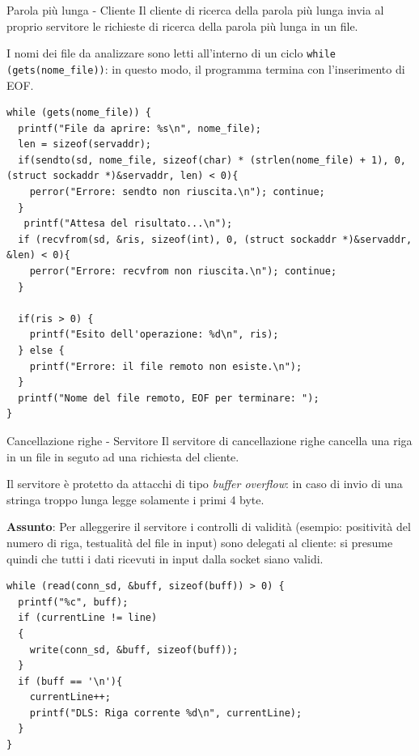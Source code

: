 \documentclass[8pt]{beamer}
\begin{document}
\begin{frame}[fragile]{Parola più lunga - Cliente}
  Il cliente di ricerca della parola più lunga invia al proprio servitore le richieste di ricerca della parola più lunga in un file.
  
  I nomi dei file da analizzare sono letti all'interno di un ciclo \texttt{while (gets(nome\_file))}: 
  in questo modo, il programma termina con l'inserimento di EOF. 
  \small
  \begin{verbatim}
while (gets(nome_file)) {
  printf("File da aprire: %s\n", nome_file);
  len = sizeof(servaddr);
  if(sendto(sd, nome_file, sizeof(char) * (strlen(nome_file) + 1), 0, (struct sockaddr *)&servaddr, len) < 0){
    perror("Errore: sendto non riuscita.\n"); continue;
  }
   printf("Attesa del risultato...\n");
  if (recvfrom(sd, &ris, sizeof(int), 0, (struct sockaddr *)&servaddr, &len) < 0){
    perror("Errore: recvfrom non riuscita.\n"); continue;
  }
  
  if(ris > 0) {
    printf("Esito dell'operazione: %d\n", ris);
  } else {
    printf("Errore: il file remoto non esiste.\n");
  }
  printf("Nome del file remoto, EOF per terminare: ");
}
  \end{verbatim}
\normalsize
\end{frame}
\begin{frame}[fragile]{Cancellazione righe - Servitore}
  Il servitore di cancellazione righe cancella una riga in un file in seguto ad una richiesta del cliente.

  Il servitore è protetto da attacchi di tipo \textit{buffer overflow}: 
  in caso di invio di una stringa troppo lunga legge solamente i primi 4 byte.

  \textbf{Assunto}: Per alleggerire il servitore i controlli di validità (esempio: positività del numero di riga, testualità del file in input) sono delegati al cliente:
  si presume quindi che tutti i dati ricevuti in input dalla socket siano validi. 

  \begin{verbatim}
while (read(conn_sd, &buff, sizeof(buff)) > 0) {
  printf("%c", buff);
  if (currentLine != line)
  {
    write(conn_sd, &buff, sizeof(buff));
  }
  if (buff == '\n'){
    currentLine++;
    printf("DLS: Riga corrente %d\n", currentLine);
  }
}
  \end{verbatim}

  
\end{frame}
\end{document}
